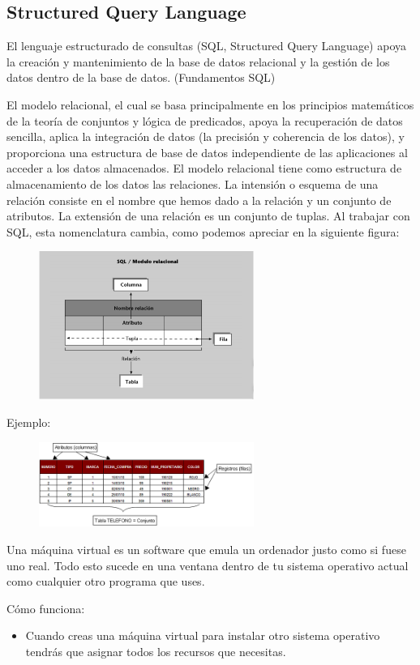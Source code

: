 \documentclass[%
 reprint,
 amsmath,amssymb,
 aps,
]{revtex4-1}
\begin{document}
\subsection{ Structured Query Language}
\par El lenguaje estructurado de consultas (SQL, Structured Query Language) apoya la creación y mantenimiento de la base de datos relacional y la gestión de los datos dentro de la base de datos. (Fundamentos SQL)

El modelo relacional, el cual se basa principalmente en los principios matemáticos de la teoría de conjuntos y lógica de predicados, apoya la recuperación de datos sencilla, aplica la integración de datos (la precisión y coherencia de los datos), y proporciona una estructura de base de datos independiente de las aplicaciones al acceder a los datos almacenados.
El modelo relacional tiene como estructura de almacenamiento de los datos las relaciones. La intensión o esquema de una relación consiste en el nombre que hemos dado a la relación y un conjunto de atributos. La extensión de una relación es un conjunto de tuplas. Al trabajar con SQL, esta nomenclatura cambia, como podemos apreciar en la siguiente figura:
\begin{figure}[htb]
	\begin{center}
	\includegraphics[width=7cm]{./Imagenes/SQLmodelo.png}
	\end{center}
	\end{figure}
\par Ejemplo:
\begin{figure}[htb]
	\begin{center}
	\includegraphics[width=7cm]{./Imagenes/SQLmodelo2.png}
	\end{center}
	\end{figure}
\par Una máquina virtual es un software que emula un ordenador justo como si fuese uno real. Todo esto sucede en una ventana dentro de tu sistema operativo actual como cualquier otro programa que uses.
\par Cómo funciona:
	\begin{itemize}
		\item Cuando creas una máquina virtual para instalar otro sistema operativo tendrás que asignar todos los recursos que necesitas.
	\end{itemize}
\end{document}
